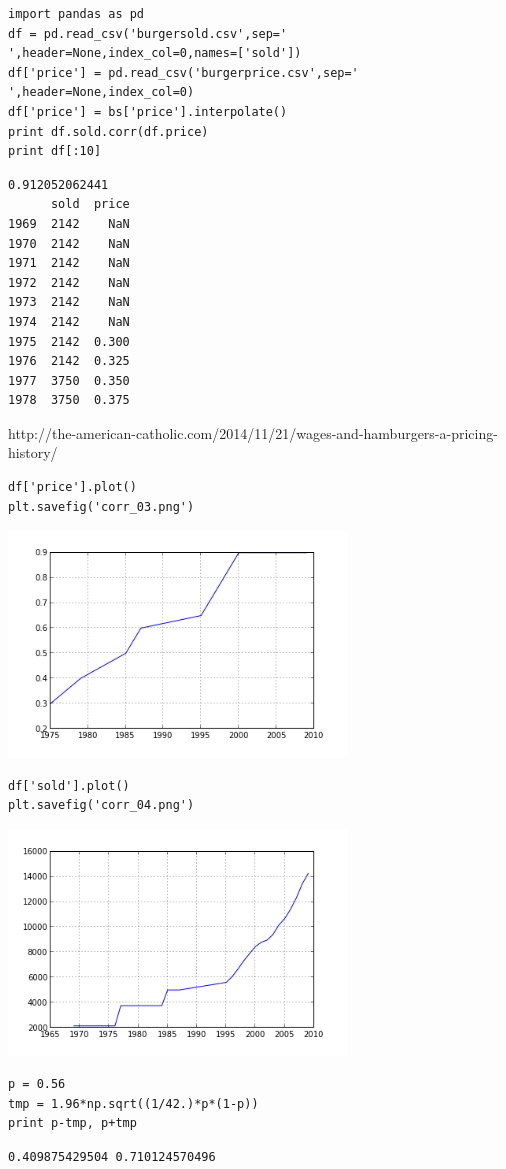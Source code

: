 \documentclass[12pt,fleqn]{article}\usepackage{../common}
\begin{document}
\begin{verbatim}
import pandas as pd
df = pd.read_csv('burgersold.csv',sep=' ',header=None,index_col=0,names=['sold'])
df['price'] = pd.read_csv('burgerprice.csv',sep=' ',header=None,index_col=0)
df['price'] = bs['price'].interpolate()
print df.sold.corr(df.price)
print df[:10]
\end{verbatim}

\begin{verbatim}
0.912052062441
      sold  price
1969  2142    NaN
1970  2142    NaN
1971  2142    NaN
1972  2142    NaN
1973  2142    NaN
1974  2142    NaN
1975  2142  0.300
1976  2142  0.325
1977  3750  0.350
1978  3750  0.375
\end{verbatim}

http://the-american-catholic.com/2014/11/21/wages-and-hamburgers-a-pricing-history/

\begin{verbatim}
df['price'].plot()
plt.savefig('corr_03.png')
\end{verbatim}

\includegraphics[height=6cm]{corr_03.png}


\begin{verbatim}
df['sold'].plot()
plt.savefig('corr_04.png')
\end{verbatim}

\includegraphics[height=6cm]{corr_04.png}














\begin{verbatim}
p = 0.56
tmp = 1.96*np.sqrt((1/42.)*p*(1-p))
print p-tmp, p+tmp
\end{verbatim}

\begin{verbatim}
0.409875429504 0.710124570496
\end{verbatim}
\end{document}
